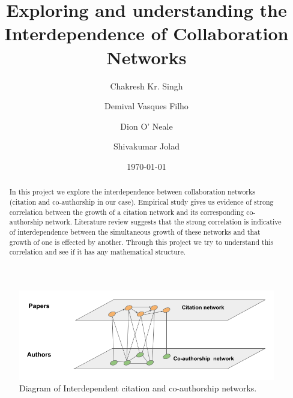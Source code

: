 \documentclass[aps, pre, twocolumn, nofootinbib]{revtex4-1}
\begin{document}

\title{Exploring and understanding the Interdependence of Collaboration Networks}

\author{Chakresh Kr. Singh}
\author{Demival Vasques Filho}
\author{Dion O' Neale}

\author{Shivakumar Jolad}


\date{\today}

\begin{abstract}
In this project we explore the interdependence between collaboration networks (citation and co-authorship in our case). Empirical study gives us evidence of strong correlation between the growth of a citation network and its corresponding co-authorship network. Literature review suggests that the strong correlation is indicative of interdependence between the simultaneous growth of these networks and that growth of one is effected by another. Through this project we try to understand this correlation and see if it has any mathematical structure.


\end{abstract}

\maketitle

\begin{figure}[htbp]
	\centering
	\includegraphics[scale = 0.5]{plots/schematic_of_networks}
	
	\captionsetup{singlelinecheck=false, justification=raggedright,  labelsep=space}
	\caption{Diagram of Interdependent citation and co-authorship networks.}
	\label{fi}
\end{figure}
\end{document}
